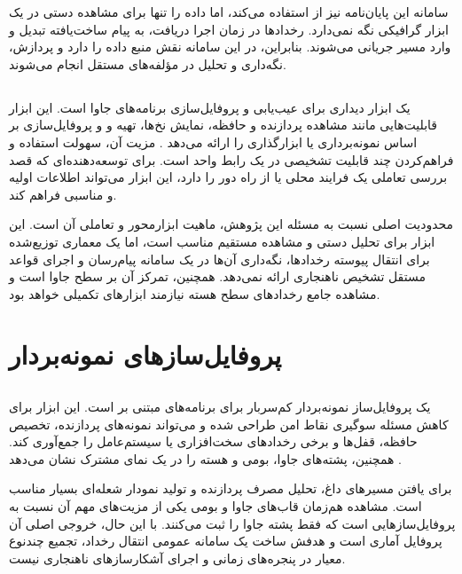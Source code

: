 سامانه این پایان‌نامه نیز از  استفاده می‌کند، اما داده را تنها
برای مشاهده دستی در یک ابزار گرافیکی نگه نمی‌دارد. رخدادها در زمان اجرا
دریافت، به پیام ساخت‌یافته تبدیل و وارد مسیر جریانی می‌شوند. بنابراین،
 در این سامانه نقش منبع داده را دارد و پردازش، نگه‌داری و تحلیل
در مؤلفه‌های مستقل انجام می‌شوند.

\subsection{}

 یک ابزار دیداری برای عیب‌یابی و پروفایل‌سازی برنامه‌های
جاوا است. این ابزار قابلیت‌هایی مانند مشاهده پردازنده و حافظه، نمایش
نخ‌ها، تهیه  و  و پروفایل‌سازی بر اساس
نمونه‌برداری یا ابزارگذاری را ارائه می‌دهد \cite{visualvmdocs}. مزیت
آن، سهولت استفاده و فراهم‌کردن چند قابلیت تشخیصی در یک رابط واحد است.
برای توسعه‌دهنده‌ای که قصد بررسی تعاملی یک فرایند محلی یا از راه دور را
دارد، این ابزار می‌تواند اطلاعات اولیه و مناسبی فراهم کند.

محدودیت اصلی  نسبت به مسئله این پژوهش، ماهیت ابزارمحور و
تعاملی آن است. این ابزار برای تحلیل دستی و مشاهده مستقیم مناسب است، اما
یک معماری توزیع‌شده برای انتقال پیوسته رخدادها، نگه‌داری آن‌ها در یک
سامانه پیام‌رسان و اجرای قواعد مستقل تشخیص ناهنجاری ارائه نمی‌دهد.
همچنین، تمرکز آن بر سطح جاوا است و مشاهده جامع رخدادهای سطح هسته نیازمند
ابزارهای تکمیلی خواهد بود.

\section{پروفایل‌سازهای نمونه‌بردار}
\label{sec:related-sampling-profilers}

\subsection{}

 یک پروفایل‌ساز نمونه‌بردار کم‌سربار برای برنامه‌های
مبتنی بر  است. این ابزار برای کاهش مسئله سوگیری نقاط امن%
طراحی شده و می‌تواند نمونه‌های پردازنده، تخصیص حافظه، قفل‌ها و برخی
رخدادهای سخت‌افزاری یا سیستم‌عامل را جمع‌آوری کند. همچنین، پشته‌های جاوا،
بومی و هسته را در یک نمای مشترک نشان می‌دهد \cite{asyncprofiler}.

 برای یافتن مسیرهای داغ، تحلیل مصرف پردازنده و تولید
نمودار شعله‌ای بسیار مناسب است. مشاهده هم‌زمان قاب‌های جاوا و بومی یکی از
مزیت‌های مهم آن نسبت به پروفایل‌سازهایی است که فقط پشته جاوا را ثبت
می‌کنند. با این حال، خروجی اصلی آن پروفایل آماری است و هدفش ساخت یک
سامانه عمومی انتقال رخداد، تجمیع چندنوع معیار در پنجره‌های زمانی و اجرای
آشکارسازهای ناهنجاری نیست.

